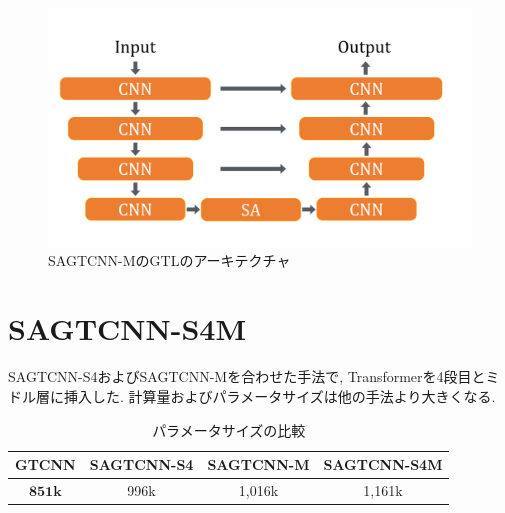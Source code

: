 \begin{figure}[htbp]
\centering
\includegraphics[scale=0.3]{figures/GTL_M.png}
\caption{SAGTCNN-MのGTLのアーキテクチャ　\label{fig:GTL_M}}
\end{figure}

\section{SAGTCNN-S4M}
SAGTCNN-S4およびSAGTCNN-Mを合わせた手法で, Transformerを4段目とミドル層に挿入した. 計算量およびパラメータサイズは他の手法より大きくなる. 

\begin{table}[htbp]
\centering
\caption{パラメータサイズの比較 \label{tab:p_size}}
 \begin{tabular}{|c|c|c|c|}
 \hline
 GTCNN & SAGTCNN-S4 & SAGTCNN-M & SAGTCNN-S4M \\ \hline \hline 
   $\mathbf{851k}$ & 996k & 1,016k & 1,161k \\ \hline
 \end{tabular}
\end{table}